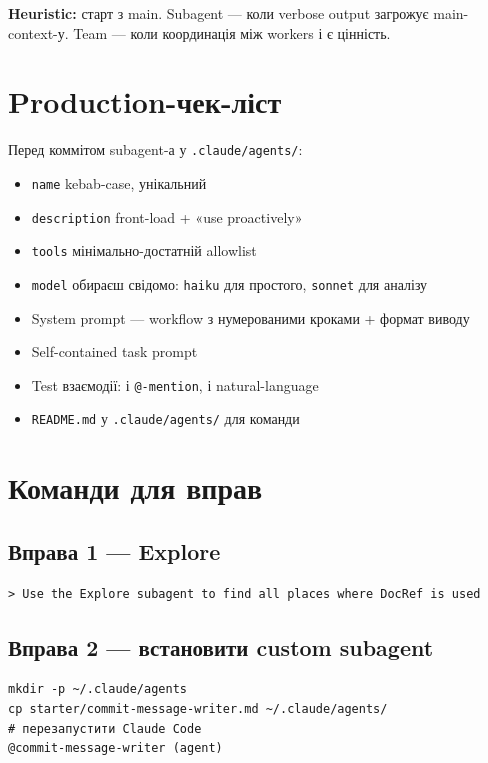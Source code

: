 \documentclass[11pt,a4paper]{article}
\begin{document}
\textbf{Heuristic:} старт з main. Subagent --- коли verbose output загрожує main-context-у. Team --- коли координація між workers і є цінність.

\section{Production-чек-ліст}

Перед коммітом subagent-а у \texttt{.claude/agents/}:

\begin{itemize}[leftmargin=2em]
\item[$\square$] \texttt{name} kebab-case, унікальний
\item[$\square$] \texttt{description} front-load + «use proactively»
\item[$\square$] \texttt{tools} мінімально-достатній allowlist
\item[$\square$] \texttt{model} обираєш свідомо: \texttt{haiku} для простого, \texttt{sonnet} для аналізу
\item[$\square$] System prompt --- workflow з нумерованими кроками + формат виводу
\item[$\square$] Self-contained task prompt
\item[$\square$] Test взаємодії: і \texttt{@-mention}, і natural-language
\item[$\square$] \texttt{README.md} у \texttt{.claude/agents/} для команди
\end{itemize}

\section{Команди для вправ}

\subsection{Вправа 1 --- Explore}

\begin{lstlisting}
> Use the Explore subagent to find all places where DocRef is used
\end{lstlisting}

\subsection{Вправа 2 --- встановити custom subagent}

\begin{lstlisting}
mkdir -p ~/.claude/agents
cp starter/commit-message-writer.md ~/.claude/agents/
# перезапустити Claude Code
@commit-message-writer (agent)
\end{lstlisting}
\end{document}

